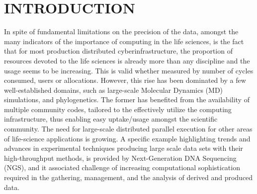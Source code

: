 \documentclass[]{svjour3}
\begin{document}

\section{INTRODUCTION}




In spite of fundamental limitations on the precision of the data,
amongst the many indicators of the importance of computing in the life
sciences, is the fact that for most production distributed
cyberinfrastructure, the proportion of resources devoted to the life
sciences is already more than any discipline and the usage seems to be
increasing. This is valid whether measured by number of cycles
consumed, users or allocations.  However, this rise has been dominated
by a few well-established domains,
such as large-scale Molecular Dynamics (MD) simulations, and
phylogenetics.  The former has benefited from the availability of
multiple community codes, tailored to the effectively utilize the
computing infrastructure, thus enabling easy uptake/usage amongst the
scientific community.  The need for large-scale distributed parallel
execution for other areas of life-science applications is growing.  A
specific example highlighting trends and advances in experimental
techniques producing large scale data sets with their high-throughput
methods, is provided by Next-Generation DNA Sequencing (NGS), and it
associated challenge of increasing computational sophistication
required in the gathering, management, and the analysis of derived and
produced data.
\end{document}
